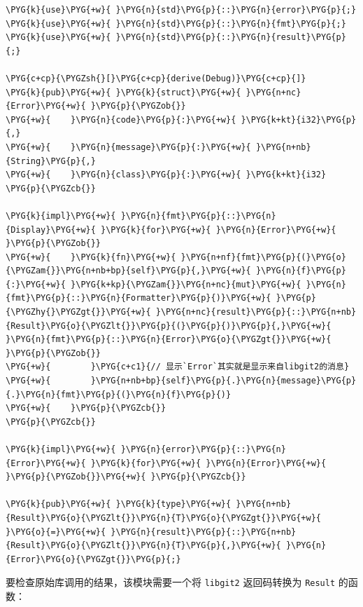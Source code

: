 \begin{Verbatim}[commandchars=\\\{\},breaklines=true,breakanywhere=true,fontsize=\codefont,xleftmargin=17bp]
\PYG{k}{use}\PYG{+w}{ }\PYG{n}{std}\PYG{p}{::}\PYG{n}{error}\PYG{p}{;}
\PYG{k}{use}\PYG{+w}{ }\PYG{n}{std}\PYG{p}{::}\PYG{n}{fmt}\PYG{p}{;}
\PYG{k}{use}\PYG{+w}{ }\PYG{n}{std}\PYG{p}{::}\PYG{n}{result}\PYG{p}{;}

\PYG{c+cp}{\PYGZsh{}[}\PYG{c+cp}{derive(Debug)}\PYG{c+cp}{]}
\PYG{k}{pub}\PYG{+w}{ }\PYG{k}{struct}\PYG{+w}{ }\PYG{n+nc}{Error}\PYG{+w}{ }\PYG{p}{\PYGZob{}}
\PYG{+w}{    }\PYG{n}{code}\PYG{p}{:}\PYG{+w}{ }\PYG{k+kt}{i32}\PYG{p}{,}
\PYG{+w}{    }\PYG{n}{message}\PYG{p}{:}\PYG{+w}{ }\PYG{n+nb}{String}\PYG{p}{,}
\PYG{+w}{    }\PYG{n}{class}\PYG{p}{:}\PYG{+w}{ }\PYG{k+kt}{i32}
\PYG{p}{\PYGZcb{}}

\PYG{k}{impl}\PYG{+w}{ }\PYG{n}{fmt}\PYG{p}{::}\PYG{n}{Display}\PYG{+w}{ }\PYG{k}{for}\PYG{+w}{ }\PYG{n}{Error}\PYG{+w}{ }\PYG{p}{\PYGZob{}}
\PYG{+w}{    }\PYG{k}{fn}\PYG{+w}{ }\PYG{n+nf}{fmt}\PYG{p}{(}\PYG{o}{\PYGZam{}}\PYG{n+nb+bp}{self}\PYG{p}{,}\PYG{+w}{ }\PYG{n}{f}\PYG{p}{:}\PYG{+w}{ }\PYG{k+kp}{\PYGZam{}}\PYG{n+nc}{mut}\PYG{+w}{ }\PYG{n}{fmt}\PYG{p}{::}\PYG{n}{Formatter}\PYG{p}{)}\PYG{+w}{ }\PYG{p}{\PYGZhy{}\PYGZgt{}}\PYG{+w}{ }\PYG{n+nc}{result}\PYG{p}{::}\PYG{n+nb}{Result}\PYG{o}{\PYGZlt{}}\PYG{p}{(}\PYG{p}{)}\PYG{p}{,}\PYG{+w}{ }\PYG{n}{fmt}\PYG{p}{::}\PYG{n}{Error}\PYG{o}{\PYGZgt{}}\PYG{+w}{ }\PYG{p}{\PYGZob{}}
\PYG{+w}{        }\PYG{c+c1}{// 显示`Error`其实就是显示来自libgit2的消息}
\PYG{+w}{        }\PYG{n+nb+bp}{self}\PYG{p}{.}\PYG{n}{message}\PYG{p}{.}\PYG{n}{fmt}\PYG{p}{(}\PYG{n}{f}\PYG{p}{)}
\PYG{+w}{    }\PYG{p}{\PYGZcb{}}
\PYG{p}{\PYGZcb{}}

\PYG{k}{impl}\PYG{+w}{ }\PYG{n}{error}\PYG{p}{::}\PYG{n}{Error}\PYG{+w}{ }\PYG{k}{for}\PYG{+w}{ }\PYG{n}{Error}\PYG{+w}{ }\PYG{p}{\PYGZob{}}\PYG{+w}{ }\PYG{p}{\PYGZcb{}}

\PYG{k}{pub}\PYG{+w}{ }\PYG{k}{type}\PYG{+w}{ }\PYG{n+nb}{Result}\PYG{o}{\PYGZlt{}}\PYG{n}{T}\PYG{o}{\PYGZgt{}}\PYG{+w}{ }\PYG{o}{=}\PYG{+w}{ }\PYG{n}{result}\PYG{p}{::}\PYG{n+nb}{Result}\PYG{o}{\PYGZlt{}}\PYG{n}{T}\PYG{p}{,}\PYG{+w}{ }\PYG{n}{Error}\PYG{o}{\PYGZgt{}}\PYG{p}{;}
\end{Verbatim}

要检查原始库调用的结果，该模块需要一个将 \texttt{libgit2} 返回码转换为 \texttt{Result} 的函数：

